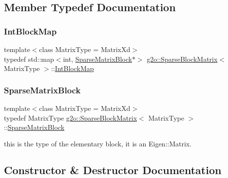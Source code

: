 \subsection{Member Typedef Documentation}
\mbox{\label{classg2o_1_1_sparse_block_matrix_aaa6ca1ae454ed70f62992b6401645f4e}} 
\subsubsection{\texorpdfstring{Int\+Block\+Map}{IntBlockMap}}
{\footnotesize\ttfamily template$<$class Matrix\+Type = Matrix\+Xd$>$ \\
typedef std\+::map$<$int, \mbox{\hyperlink{classg2o_1_1_sparse_block_matrix_ab2f7376cbf055803fda6527dcc43e3be}{Sparse\+Matrix\+Block}}$\ast$$>$ \mbox{\hyperlink{classg2o_1_1_sparse_block_matrix}{g2o\+::\+Sparse\+Block\+Matrix}}$<$ Matrix\+Type $>$\+::\mbox{\hyperlink{classg2o_1_1_sparse_block_matrix_aaa6ca1ae454ed70f62992b6401645f4e}{Int\+Block\+Map}}}

\mbox{\label{classg2o_1_1_sparse_block_matrix_ab2f7376cbf055803fda6527dcc43e3be}} 
\subsubsection{\texorpdfstring{Sparse\+Matrix\+Block}{SparseMatrixBlock}}
{\footnotesize\ttfamily template$<$class Matrix\+Type = Matrix\+Xd$>$ \\
typedef Matrix\+Type \mbox{\hyperlink{classg2o_1_1_sparse_block_matrix}{g2o\+::\+Sparse\+Block\+Matrix}}$<$ Matrix\+Type $>$\+::\mbox{\hyperlink{classg2o_1_1_sparse_block_matrix_ab2f7376cbf055803fda6527dcc43e3be}{Sparse\+Matrix\+Block}}}



this is the type of the elementary block, it is an Eigen\+::\+Matrix. 



\subsection{Constructor \& Destructor Documentation}
\mbox{\label{classg2o_1_1_sparse_block_matrix_a0407f26837522322d7b7fd7a5259ee3c}} 

